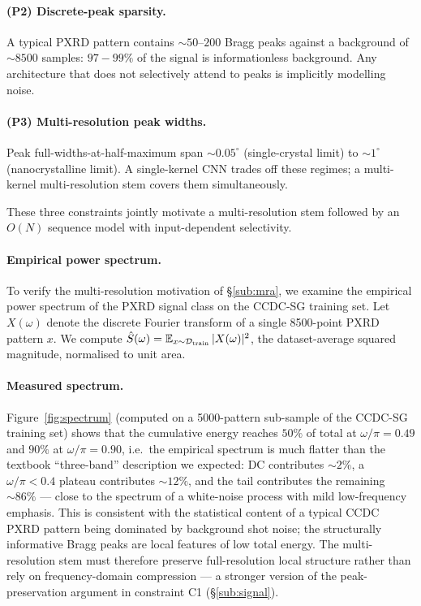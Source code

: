 \documentclass[final]{ws-ijwmip}
\begin{document}
\paragraph{(P2) Discrete-peak sparsity.}
A typical PXRD pattern contains $\sim 50$--$200$ Bragg peaks against a
background of $\sim 8500$ samples: $97\!-\!99\%$ of the signal is
informationless background. Any architecture that does not selectively
attend to peaks is implicitly modelling noise.

\paragraph{(P3) Multi-resolution peak widths.}
Peak full-widths-at-half-maximum span $\sim 0.05^\circ$ (single-crystal
limit) to $\sim 1^\circ$ (nanocrystalline limit). A single-kernel CNN
trades off these regimes; a multi-kernel multi-resolution stem covers
them simultaneously.

These three constraints jointly motivate a multi-resolution stem
followed by an $O(N)$ sequence model with input-dependent selectivity.

\paragraph{Empirical power spectrum.}
To verify the multi-resolution motivation of \S\ref{sub:mra}, we examine
the empirical power spectrum of the PXRD signal class on the CCDC-SG
training set. Let $X(\omega)$ denote the discrete Fourier transform of
a single 8500-point PXRD pattern $x$. We compute
$\hat S(\omega) = \mathbb{E}_{x\sim\mathcal{D}_{\rm train}}\,|X(\omega)|^2$,
the dataset-average squared magnitude, normalised to unit area.

\paragraph{Measured spectrum.}
Figure~\ref{fig:spectrum} (computed on a 5000-pattern sub-sample of the
CCDC-SG training set) shows that the cumulative energy reaches $50\%$
of total at $\omega/\pi=0.49$ and $90\%$ at $\omega/\pi=0.90$, i.e.\ the
empirical spectrum is much flatter than the textbook ``three-band''
description we expected: DC contributes $\sim 2\%$, a $\omega/\pi<0.4$
plateau contributes $\sim 12\%$, and the tail contributes the remaining
$\sim 86\%$ — close to the spectrum of a white-noise process with
mild low-frequency emphasis. This is consistent with the statistical
content of a typical CCDC PXRD pattern being dominated by background
shot noise; the structurally informative Bragg peaks are local
features of low total energy. The multi-resolution stem must therefore
preserve full-resolution local structure rather than rely on
frequency-domain compression — a stronger version of the
peak-preservation argument in constraint C1 (\S\ref{sub:signal}).
\end{document}
